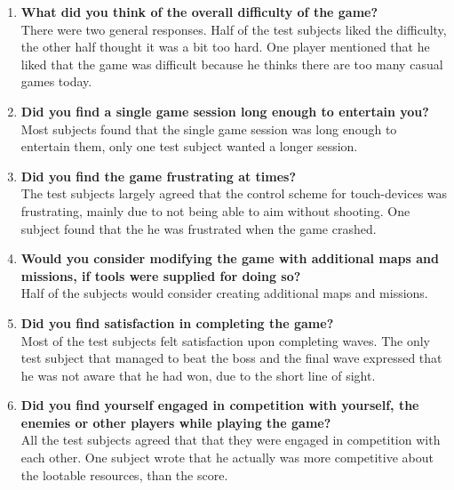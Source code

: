 \begin{enumerate}
\item \textbf{What did you think of the overall difficulty of the game?}\vspace{4pt}\\
There were two general responses.
Half of the test subjects liked the difficulty, the other half thought it was a bit too hard.
One player mentioned that he liked that the game was difficult because he thinks there are too many casual games today.

\item \textbf{Did you find a single game session long enough to entertain you?}\vspace{4pt}\\
Most subjects found that the single game session was long enough to entertain them, only one test subject wanted a longer session.

\item \textbf{Did you find the game frustrating at times?}\vspace{4pt}\\
The test subjects largely agreed that the control scheme for touch-devices was frustrating, mainly due to not being able to aim without shooting.
One subject found that the he was frustrated when the game crashed.

\item \textbf{Would you consider modifying the game with additional maps and missions, if tools were supplied for doing so?}\vspace{4pt}\\
Half of the subjects would consider creating additional maps and missions.

\item \textbf{Did you find satisfaction in completing the game?}\vspace{4pt}\\
Most of the test subjects felt satisfaction upon completing waves.
The only test subject that managed to beat the boss and the final wave expressed that he was not aware that he had won, due to the short line of sight.

\item \textbf{Did you find yourself engaged in competition with yourself, the enemies or other players while playing the game?}\vspace{4pt}\\
All the test subjects agreed that that they were engaged in competition with each other.
One subject wrote that he actually was more competitive about the lootable resources, than the score.


\end{enumerate}
